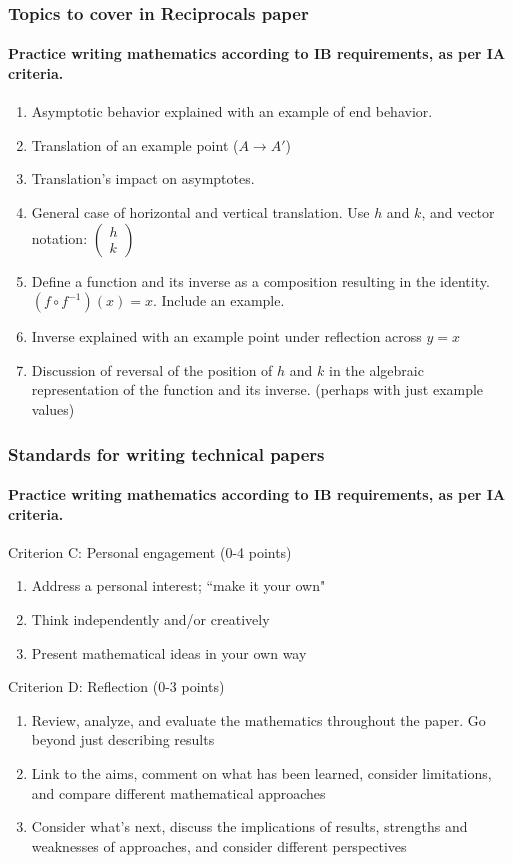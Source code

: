 \documentclass{beamer}
\begin{document}
\frame
{
  \frametitle{Topics to cover in Reciprocals paper}
  \framesubtitle{Practice writing mathematics according to IB requirements, as per IA criteria.}
\begin{enumerate}
\item Asymptotic behavior explained with an example of end behavior. 
\item Translation of an example point ($A \xrightarrow{} A'$)
\item Translation's impact on asymptotes.
\item General case of horizontal and vertical translation. Use $h$ and $k$, and vector notation: $\begin{pmatrix} h \\ k \end{pmatrix}$
\item Define a function and its inverse as a composition resulting in the identity. $(f \circ f^{-1})(x)=x$. Include an example.
\item Inverse explained with an example point under reflection across $y=x$
\item Discussion of reversal of the position of $h$ and $k$ in the algebraic representation of the function and its inverse. (perhaps with just example values)
\end{enumerate}
}


\frame
{
  \frametitle{Standards for writing technical papers}
  \framesubtitle{Practice writing mathematics according to IB requirements, as per IA criteria.}
Criterion C: Personal engagement (0-4 points)
\begin{enumerate}
    \item Address a personal interest; ``make it your own"
    \item Think independently and/or creatively
    \item Present mathematical ideas in your own way 
\end{enumerate}
Criterion D: Reflection (0-3 points)
\begin{enumerate}
    \item Review, analyze, and evaluate the mathematics throughout the paper. Go beyond just describing results
    \item Link to the aims, comment on what has been learned, consider limitations, and compare different mathematical approaches
    \item Consider what's next, discuss the implications of results, strengths and weaknesses of approaches, and consider different perspectives
\end{enumerate}
}
\end{document}
